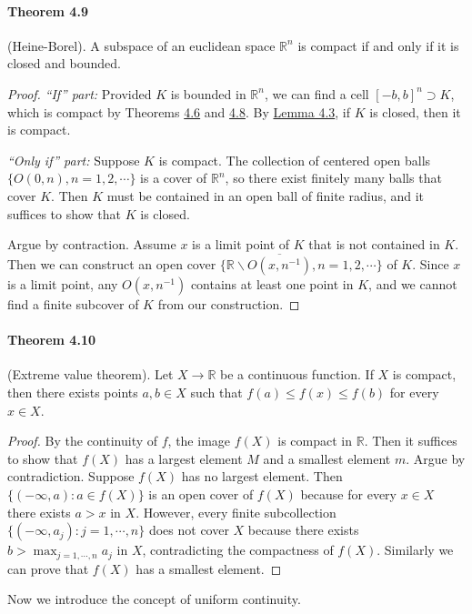 \documentclass{article}
\numberwithin{equation}{section}
\theoremstyle{plain}
\theoremstyle{definition}
\begin{document}
\paragraph{Theorem 4.9\label{thm:4.9}} (Heine-Borel). A subspace of an euclidean space $\mathbb{R}^n$ is compact if and only if it is closed and bounded.
\begin{proof}
\textit{``If'' part:} Provided $K$ is bounded in $\mathbb{R}^n$, we can find a cell $[-b,b]^n\supset K$, which is compact by Theorems \hyperref[thm:4.6]{4.6} and \hyperref[thm:4.8]{4.8}. By \hyperref[lemma:4.3]{Lemma 4.3}, if $K$ is closed, then it is compact.

\textit{``Only if'' part:} Suppose $K$ is compact. The collection of centered open balls $\{O(0,n),n=1,2,\cdots\}$ is a cover of $\mathbb{R}^n$, so there exist finitely many balls that cover $K$. Then $K$ must be contained in an open ball of finite radius, and it suffices to show that $K$ is closed. 

Argue by contraction. Assume $x$ is a limit point of $K$ that is not contained in $K$. Then we can construct an open cover $\bigl\{\mathbb{R}\backslash\overline{O(x,n^{-1})},n=1,2,\cdots\bigr\}$ of $K$. Since $x$ is a limit point, any $O(x,n^{-1})$ contains at least one point in $K$, and we cannot find a finite subcover of $K$ from our construction.
\end{proof}

\paragraph{Theorem 4.10\label{thm:4.10}} (Extreme value theorem). Let $X\to\mathbb{R}$ be a continuous function. If $X$ is compact, then there exists points $a,b\in X$ such that $f(a)\leq f(x)\leq f(b)$ for every $x\in X$.
\begin{proof}
By the continuity of $f$, the image $f(X)$ is compact in $\mathbb{R}$. Then it suffices to show that $f(X)$ has a largest element $M$ and a smallest element $m$. Argue by contradiction. Suppose $f(X)$ has no largest element. Then $\{(-\infty,a):a\in f(X)\}$ is an open cover of $f(X)$ because for every $x\in X$ there exists $a>x$ in $X$. However, every finite subcollection $\{(-\infty,a_j):j=1,\cdots,n\}$ does not cover $X$ because there exists $b > \max_{j=1,\cdots,n} a_j$ in $X$, contradicting the compactness of $f(X)$. Similarly we can prove that $f(X)$ has a smallest element.
\end{proof}

Now we introduce the concept of uniform continuity.
\end{document}
